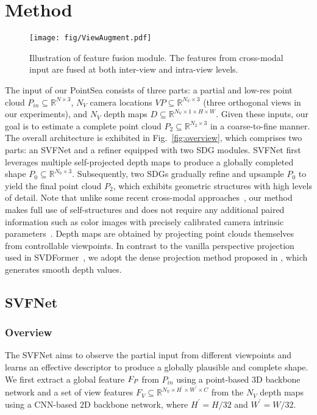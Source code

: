 \section{Method}
\begin{figure*}[h]
  \centering
  \texttt{[image: fig/ViewAugment.pdf]}
\caption{Illustration of feature fusion module. The features from cross-modal input are fused at both inter-view and intra-view levels.}
  \label{fig:VA}
\end{figure*}
The input of our PointSea consists of three parts: a partial and low-res point cloud $P_{in}\subseteq\mathbb{R}^{N\times3}$, $N_V$ camera locations $VP\subseteq\mathbb{R}^{N_V\times3}$ (three orthogonal views in our experiments), and $N_V$ depth maps $D\subseteq\mathbb{R}^{N_V\times1\times H \times W}$.
Given these inputs, our goal is to estimate a complete point cloud $P_{2}\subseteq\mathbb{R}^{N_2\times3}$ in a coarse-to-fine manner.
The overall architecture is exhibited in Fig.~\ref{fig:overview}, which comprises two parts: an SVFNet and a refiner equipped with two SDG modules. 
SVFNet first leverages multiple self-projected depth maps to produce a globally completed shape $P_0\subseteq\mathbb{R}^{N_0\times3}$. Subsequently, two SDGs gradually refine and upsample $P_0$ to yield the final point cloud $P_{2}$, which exhibits geometric structures with high levels of detail.
Note that unlike some recent cross-modal approaches~\citep{zhang2021view,zhu2023csdn,aiello2022crossmodal,zhang2022shape}, our method makes full use of self-structures and does not require any additional paired information such as color images with precisely calibrated camera intrinsic parameters~\citep{zhang2021view,zhu2023csdn}. 
Depth maps are obtained by projecting point clouds themselves from controllable viewpoints. In contrast to the vanilla perspective projection used in SVDFormer~\citep{Zhu_2023_ICCV}, we adopt the dense projection method proposed in \citep{PointCLIPV2}, which generates smooth depth values.



\subsection{SVFNet}
\subsubsection{Overview}
The SVFNet aims to observe the partial input from different viewpoints and learns an effective descriptor to produce a globally plausible and complete shape. We first extract a global feature $F_\emph{P}$ from $P_{in}$ using a point-based 3D backbone network and a set of view features $F_V\subseteq\mathbb{R}^{N_V\times H^{\prime} \times W^{\prime} \times C}$ from the $N_V$ depth maps using a CNN-based 2D backbone network, where $H^{\prime}=H/32$ and $W^{\prime}=W/32$. 
% 

